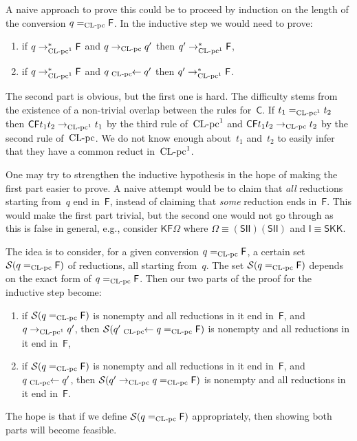 \documentclass[a4paper,UKenglish]{lipics-v2016}
\newcommand{\Cs}{\mathsf{C}}
\newcommand{\Fs}{\mathsf{F}}
\newcommand{\Ss}{\mathsf{S}}
\newcommand{\Ks}{\mathsf{K}}
\newcommand{\Is}{\mathsf{I}}
\newcommand{\from}{\ensuremath{\leftarrow}}
\newcommand{\reduces}{\ensuremath{\to^*}}
\newcommand{\leftidx}[3]{{\;\vphantom{#2}}#1\!\!#2#3}
\newcommand{\Sc}{\ensuremath{{\mathcal S}}}
\newcommand{\CLC}{{\mbox{${\text{\rm CL-pc}^1}$}}}
\newcommand{\CLCz}{{\mbox{$\text{\rm CL-pc}$}}}
\newcommand{\sCLC}{{\ensuremath{\text{\rm CL-pc}^1}}}
\newcommand{\sCLCz}{\ensuremath{\text{\rm CL-pc}}}
\begin{document}
A naive approach to prove this could be to proceed by induction on the
length of the conversion $q =_{\sCLCz} \Fs$. In the inductive step we
would need to prove:
\begin{enumerate}
\item if $q \reduces_\sCLC \Fs$ and $q \to_{\sCLCz} q'$ then
  $q' \reduces_\sCLC \Fs$,
\item if $q \reduces_\sCLC \Fs$ and
  $q \leftidx{{}_{\sCLCz}}{\from} q'$ then $q' \reduces_\sCLC \Fs$.
\end{enumerate}
The second part is obvious, but the first one is hard. The difficulty
stems from the existence of a non-trivial overlap between the rules
for~$\Cs$. If $t_1 =_\sCLC t_2$ then $\Cs \Fs t_1 t_2 \to_{\sCLC} t_1$
by the third rule of~$\CLC$ and $\Cs \Fs t_1 t_2 \to_{\sCLCz} t_2$ by
the second rule of~$\CLCz$. We do not know enough about~$t_1$
and~$t_2$ to easily infer that they have a common reduct in~$\CLC$.

One may try to strengthen the inductive hypothesis in the hope of
making the first part easier to prove. A naive attempt would be to
claim that \emph{all} reductions starting from~$q$ end in~$\Fs$,
instead of claiming that \emph{some} reduction ends in~$\Fs$. This
would make the first part trivial, but the second one would not go
through as this is false in general, e.g., consider $\Ks \Fs \Omega$
where $\Omega \equiv (\Ss \Is \Is) (\Ss \Is \Is)$ and
$\Is \equiv \Ss \Ks \Ks$.

The idea is to consider, for a given conversion $q =_{\sCLCz} \Fs$, a
certain set $\Sc(q =_{\sCLCz} \Fs)$ of reductions, all starting
from~$q$. The set $\Sc(q =_{\sCLCz} \Fs)$ depends on the exact form of
$q =_{\sCLCz} \Fs$. Then our two parts of the proof for the inductive
step become:
\begin{enumerate}
\item if $\Sc(q =_{\sCLCz} \Fs)$ is nonempty and all reductions in it
  end in~$\Fs$, and $q \to_\sCLC q'$, then
  $\Sc(q' \leftidx{{}_{\sCLCz}}{\from} q =_\sCLCz \Fs)$ is nonempty
  and all reductions in it end in~$\Fs$,
\item if $\Sc(q =_{\sCLCz} \Fs)$ is nonempty and all reductions in it
  end in~$\Fs$, and $q \leftidx{{}_{\sCLCz}}{\from} q'$, then
  $\Sc(q' \to_{\sCLCz} q =_\sCLCz \Fs)$ is nonempty and all reductions
  in it end in~$\Fs$.
\end{enumerate}
The hope is that if we define $\Sc(q =_{\sCLCz} \Fs)$ appropriately,
then showing both parts will become feasible.
\end{document}
